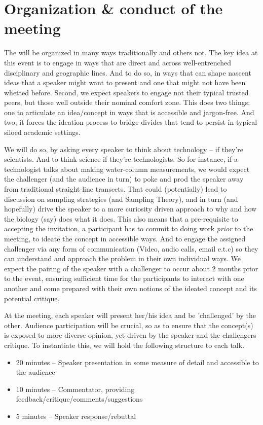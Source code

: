\section{Organization \& conduct of the meeting}

The \symp will be organized in many ways traditionally and others
not. The key idea at this event is to engage in ways that are direct and
across well-entrenched disciplinary and geographic lines. And to do so,
in ways that can shape nascent ideas that a speaker might want to
present and one that might not have been whetted before. Second, we
expect speakers to engage not their typical trusted peers, but those
well outside their nominal comfort zone. This does two things; one to
articulate an idea/concept in ways that is accessible and
jargon-free. And two, it forces the ideation process to bridge divides
that tend to persist in typical siloed academic settings.

We will do so, by asking every speaker to think about technology -- if
they're scientists. And to think science if they're technologists. So
for instance, if a technologist talks about making water-column
measurements, we would expect the challenger (and the audience in turn)
to poke and prod the speaker away from traditional straight-line
transects. That could (potentially) lead to discussion on sampling
strategies (and Sampling Theory), and in turn (and hopefully) drive the
speaker to a more curiosity driven approach to why and how the biology
(say) does what it does. This also means that a pre-requisite to
accepting the invitation, a participant has to commit to doing work
\emph{prior} to the meeting, to ideate the concept in accessible
ways. And to engage the assigned challenger via any form of
communication (Video, audio calls, email e.t.c) so they can understand
and approach the problem in their own individual ways. We expect the
pairing of the speaker with a challenger to occur about 2 months prior
to the event, ensuring sufficient time for the participants to interact
with one another and come prepared with their own notions of the ideated
concept and its potential critique. 

At the meeting, each speaker will present her/his idea and be
'challenged' by the other. Audience participation will be crucial, so as
to ensure that the concept(s) is exposed to more diverse opinion, yet
driven by the speaker and the challengers critique. To instantiate this,
we will hold the following structure to each talk.

\begin{itemize}[noitemsep,topsep=0pt,parsep=0pt,partopsep=0pt]

\item 20 minutes -- Speaker presentation in some measure of
  detail and accessible to the audience
\item 10 minutes -- Commentator, providing
  feedback/critique/comments/suggestions
\item 5 minutes -- Speaker response/rebuttal

\end{itemize}




